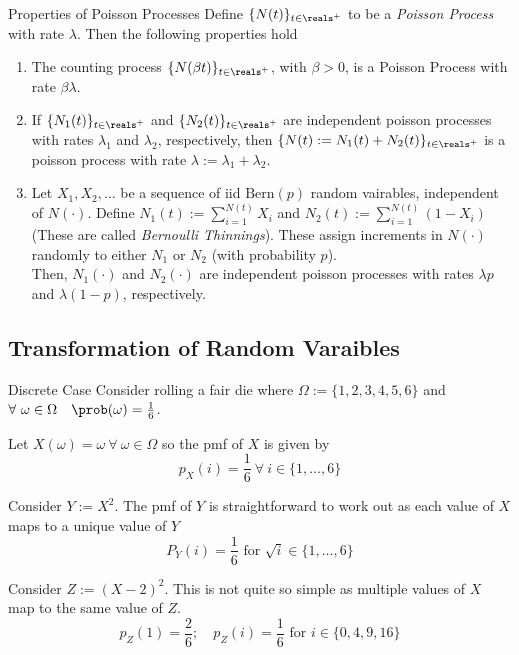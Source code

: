 \documentclass[11pt,a4paper]{article}
\begin{document}
\begin{proposition}{Properties of Poisson Processes}
  Define $\{N(t)\}_{t\in\reals^+}$ to be a \textit{Poisson Process} with rate $\lambda$. Then the following properties hold
  \begin{enumerate}
    \item The counting process $\{N(\beta t)\}_{t\in\reals^+}$, with $\beta>0$, is a Poisson Process with rate $\beta\lambda$.
    \item If $\{N_1(t)\}_{t\in\reals^+}$ and $\{N_2(t)\}_{t\in\reals^+}$ are independent poisson processes with rates $\lambda_1$ and $\lambda_2$, respectively, then $\{N(t):=N_1(t)+N_2(t)\}_{t\in\reals^+}$ is a poisson process with rate $\lambda:=\lambda_1+\lambda_2$.
    \item Let $X_1,X_2,\dots$ be a sequence of iid $\text{Bern}(p)$ random vairables, independent of $N(\cdot)$. Define $N_1(t):=\sum_{i=1}^{N(t)}X_i$ and $N_2(t):=\sum_{i=1}^{N(t)}(1-X_i)$ (These are called \textit{Bernoulli Thinnings}). These assign increments in $N(\cdot)$ randomly to either $N_1$ or $N_2$ (with probability $p$).\\
    Then, $N_1(\cdot)$ and $N_2(\cdot)$ are independent poisson processes with rates $\lambda p$ and $\lambda(1-p)$, respectively.
  \end{enumerate}
\end{proposition}

\subsection{Transformation of Random Varaibles}

\begin{example}{Discrete Case}
  Consider rolling a fair die where $\Omega:=\{1,2,3,4,5,6\}$ and $\forall\ \omega\in\Omega\quad\prob(\omega)=\frac16$.
  \par Let $X(\omega)=\omega\ \forall\ \omega\in\Omega$ so the pmf of $X$ is given by
  \[ p_X(i)=\frac16\ \forall\ i\in\{1,\dots,6\} \]
  \par Consider $Y:=X^2$. The pmf of $Y$ is straightforward to work out as each value of $X$ maps to a unique value of $Y$
  \[ P_Y(i)=\frac16\text{ for }\sqrt{i}\in\{1,\dots,6\} \]
  \par Consider $Z:=(X-2)^2$. This is not quite so simple as multiple values of $X$ map to the same value of $Z$.
  \[ p_Z(1)=\frac26;\quad p_Z(i)=\frac16\text{ for }i\in\{0,4,9,16\} \]
\end{example}
\end{document}
